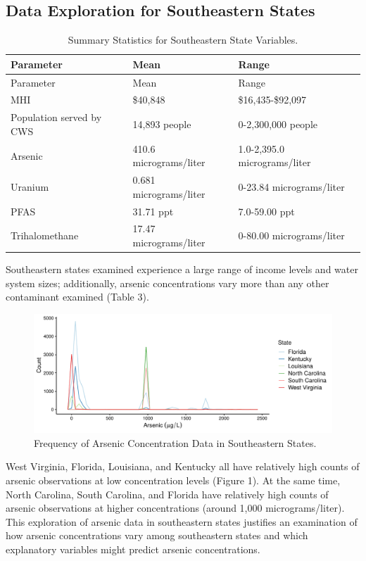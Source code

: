 \documentclass[12pt,]{article}
\begin{document}
\hypertarget{data-exploration-for-southeastern-states}{%
\subsection{Data Exploration for Southeastern
States}\label{data-exploration-for-southeastern-states}}

\begin{longtable}[]{@{}lll@{}}
\caption{Summary Statistics for Southeastern State
Variables.}\tabularnewline
\toprule
Parameter & Mean & Range\tabularnewline
\midrule
\endfirsthead
\toprule
Parameter & Mean & Range\tabularnewline
\midrule
\endhead
MHI & \$40,848 & \$16,435-\$92,097\tabularnewline
Population served by CWS & 14,893 people & 0-2,300,000
people\tabularnewline
Arsenic & 410.6 micrograms/liter & 1.0-2,395.0
micrograms/liter\tabularnewline
Uranium & 0.681 micrograms/liter & 0-23.84
micrograms/liter\tabularnewline
PFAS & 31.71 ppt & 7.0-59.00 ppt\tabularnewline
Trihalomethane & 17.47 micrograms/liter & 0-80.00
micrograms/liter\tabularnewline
\bottomrule
\end{longtable}

\begin{quote}
\end{quote}

Southeastern states examined experience a large range of income levels
and water system sizes; additionally, arsenic concentrations vary more
than any other contaminant examined (Table 3).

\begin{figure}
\centering
\includegraphics{Project_Template_files/figure-latex/figs-1.pdf}
\caption{Frequency of Arsenic Concentration Data in Southeastern
States.}
\end{figure}

West Virginia, Florida, Louisiana, and Kentucky all have relatively high
counts of arsenic observations at low concentration levels (Figure 1).
At the same time, North Carolina, South Carolina, and Florida have
relatively high counts of arsenic observations at higher concentrations
(around 1,000 micrograms/liter). This exploration of arsenic data in
southeastern states justifies an examination of how arsenic
concentrations vary among southeastern states and which explanatory
variables might predict arsenic concentrations.
\end{document}
